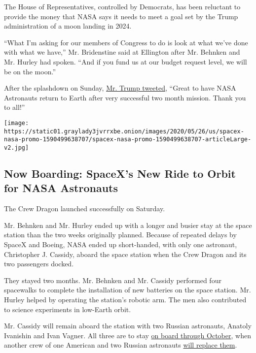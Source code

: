 The House of Representatives, controlled by Democrats, has been
reluctant to provide the money that NASA says it needs to meet a goal
set by the Trump administration of a moon landing in 2024.

``What I'm asking for our members of Congress to do is look at what
we've done with what we have,'' Mr. Bridenstine said at Ellington after
Mr. Behnken and Mr. Hurley had spoken. ``And if you fund us at our
budget request level, we will be on the moon.''

After the splashdown on Sunday,
\href{https://twitter.com/realDonaldTrump/status/1289997897723863040}{Mr.
Trump tweeted}, ``Great to have NASA Astronauts return to Earth after
very successful two month mission. Thank you to all!''

\href{https://www.nytimes3xbfgragh.onion/interactive/2020/05/26/science/spacex-nasa.html}{}

\texttt{[image: https://static01.graylady3jvrrxbe.onion/images/2020/05/26/us/spacex-nasa-promo-1590499638707/spacex-nasa-promo-1590499638707-articleLarge-v2.jpg]}

\hypertarget{now-boarding-spacexs-new-ride-to-orbit-for-nasa-astronauts}{%
\subsection{Now Boarding: SpaceX's New Ride to Orbit for NASA
Astronauts}\label{now-boarding-spacexs-new-ride-to-orbit-for-nasa-astronauts}}

The Crew Dragon launched successfully on Saturday.

Mr. Behnken and Mr. Hurley ended up with a longer and busier stay at the
space station than the two weeks originally planned. Because of repeated
delays by SpaceX and Boeing, NASA ended up short-handed, with only one
astronaut, Christopher J. Cassidy, aboard the space station when the
Crew Dragon and its two passengers docked.

They stayed two months. Mr. Behnken and Mr. Cassidy performed four
spacewalks to complete the installation of new batteries on the space
station. Mr. Hurley helped by operating the station's robotic arm. The
men also contributed to science experiments in low-Earth orbit.

Mr. Cassidy will remain aboard the station with two Russian astronauts,
Anatoly Ivanishin and Ivan Vagner. All three are to stay
\href{https://www.nasa.gov/sites/default/files/atoms/files/exp-63-summary.pdf}{on
board through October}, when another crew of one American and two
Russian astronauts
\href{https://www.nasa.gov/press-release/nasa-astronaut-kate-rubins-crewmates-to-discuss-upcoming-spaceflight}{will
replace them}.


